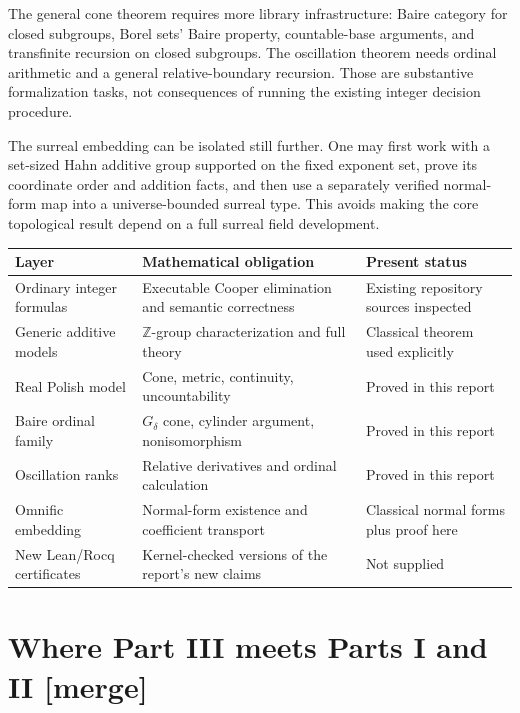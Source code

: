 \documentclass[11pt]{article}
\numberwithin{equation}{section}
\theoremstyle{definition}
\theoremstyle{remark}
\newcommand{\Z}{\mathbb Z}
\newcommand{\mergetag}{\textup{\textsf{\small[merge]}}}
\begin{document}
The general cone theorem requires more library infrastructure: Baire
category for closed subgroups, Borel sets' Baire property, countable-base
arguments, and transfinite recursion on closed subgroups. The oscillation
theorem needs ordinal arithmetic and a general relative-boundary
recursion. Those are substantive formalization tasks, not consequences of
running the existing integer decision procedure.

The surreal embedding can be isolated still further. One may first work
with a set-sized Hahn additive group supported on the fixed exponent set,
prove its coordinate order and addition facts, and then use a separately
verified normal-form map into a universe-bounded surreal type. This avoids
making the core topological result depend on a full surreal field
development.

\begin{center}
\small
\begin{tabular}{>{\raggedright\arraybackslash}p{}>{\raggedright\arraybackslash}p{}>{\raggedright\arraybackslash}p{}}
\toprule
Layer & Mathematical obligation & Present status\\
\midrule
Ordinary integer formulas & Executable Cooper elimination and semantic correctness & Existing repository sources inspected\\
Generic additive models & $\Z$-group characterization and full theory & Classical theorem used explicitly\\
Real Polish model & Cone, metric, continuity, uncountability & Proved in this report\\
Baire ordinal family & $G_\delta$ cone, cylinder argument, nonisomorphism & Proved in this report\\
Oscillation ranks & Relative derivatives and ordinal calculation & Proved in this report\\
Omnific embedding & Normal-form existence and coefficient transport & Classical normal forms plus proof here\\
New Lean/Rocq certificates & Kernel-checked versions of the report's new claims & Not supplied\\
\bottomrule
\end{tabular}
\end{center}

\section{Where Part III meets Parts I and II \mergetag}\label{pma:cp:sec:meet}
\end{document}
